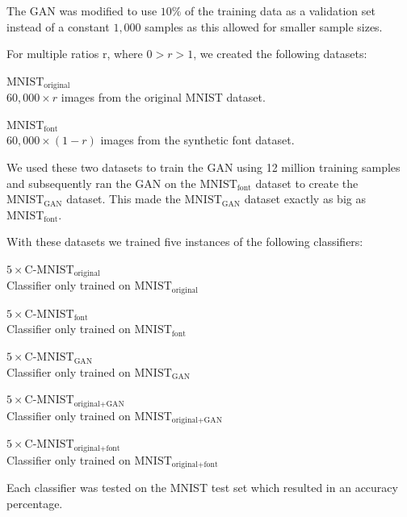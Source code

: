 \documentclass[10pt,twocolumn,letterpaper]{article}
\begin{document}
The GAN was modified to use $10\%$ of the training data as a validation set instead of a constant $1,000$ samples as this allowed for smaller sample sizes.

For multiple ratios r, where $0 > r > 1$, we created the following datasets:

\begin{description}
	\item{$\text{MNIST}_\text{original}$} \hfill \\ $60,000 \times r$ images from the original MNIST dataset.
	\item{$\text{MNIST}_\text{font}$} \hfill \\ $60,000 \times (1 - r)$ images from the synthetic font dataset.
\end{description}

We used these two datasets to train the GAN using 12 million training samples and subsequently ran the GAN on the $\text{MNIST}_\text{font}$ dataset to create the $\text{MNIST}_\text{GAN}$ dataset. This made the $\text{MNIST}_\text{GAN}$ dataset exactly as big as $\text{MNIST}_\text{font}$.


With these datasets we trained five instances of the following classifiers:

\begin{description}
	\item{$5\times \text{C-MNIST}_\text{original}$} \hfill \\ Classifier only trained on $\text{MNIST}_\text{original}$
	\item{$5\times \text{C-MNIST}_\text{font}$} \hfill \\ Classifier only trained on $\text{MNIST}_\text{font}$
	\item{$5\times \text{C-MNIST}_\text{GAN}$} \hfill \\ Classifier only trained on $\text{MNIST}_\text{GAN}$
	\item{$5\times \text{C-MNIST}_\text{original+GAN}$} \hfill \\ Classifier only trained on $\text{MNIST}_\text{original+GAN}$
	\item{$5\times \text{C-MNIST}_\text{original+font}$} \hfill \\ Classifier only trained on $\text{MNIST}_\text{original+font}$
\end{description}

Each classifier was tested on the MNIST test set which resulted in an accuracy percentage.
\end{document}
